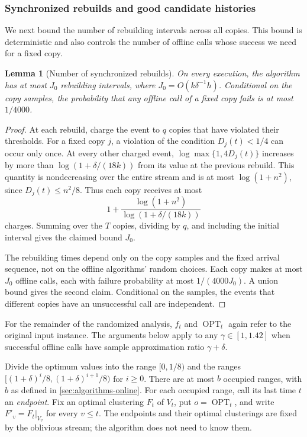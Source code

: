 \documentclass[11pt]{article}
\newtheorem{lemma}[theorem]{Lemma}
\newcommand{\OPT}{\operatorname{OPT}}
\begin{document}
\subsubsection{Synchronized rebuilds and good candidate histories}

We next bound the number of rebuilding intervals across all copies.
This bound is deterministic and also controls the number of offline
calls whose success we need for a fixed copy.

\begin{lemma}[Number of synchronized rebuilds]
\label{lem:online-rebuilds}
On every execution, the algorithm has at most $J_0$ rebuilding
intervals, where $J_0=O(k\delta^{-1}h)$.
Conditional on the copy samples, the probability that any offline
call of a fixed copy fails is at most $1/4000$.
\end{lemma}
\begin{proof}
At each rebuild, charge the event to $q$ copies that have violated
their thresholds. For a fixed copy $j$, a violation of the condition
$D_j(t)<1/4$ can occur only once. At every other charged event,
$\log\max\{1,4D_j(t)\}$ increases by more than
$\log(1+\delta/(18k))$ from its value at the previous rebuild.
This quantity is nondecreasing over the entire stream and is at most
$\log(1+n^2)$, since $D_j(t)\le n^2/8$. Thus each copy receives
at most
\[
 1+\frac{\log(1+n^2)}{\log(1+\delta/(18k))}
\]
charges. Summing over the $T$ copies, dividing by $q$, and including
the initial interval gives the claimed bound $J_0$.

The rebuilding times depend only on the copy samples and the fixed
arrival sequence, not on the offline algorithms' random choices.
Each copy makes at most $J_0$ offline calls, each with failure
probability at most $1/(4000J_0)$. A union bound gives the second
claim. Conditional on the samples, the events that different copies
have an unsuccessful call are independent.
\end{proof}

For the remainder of the randomized analysis, $f_t$ and $\OPT_t$
again refer to the original input instance. The arguments below apply
to any $\gamma\in[1,1.42]$ when successful offline calls have
sample approximation ratio $\gamma+\delta$.

Divide the optimum values into the range $[0,1/8)$
and the ranges $[(1+\delta)^i/8,(1+\delta)^{i+1}/8)$ for $i\ge0$.
There are at most $b$ occupied ranges, with $b$ as defined in
\cref{sec:algorithms-online}.
For each occupied range, call its last time $t$ an \emph{endpoint}.
Fix an optimal clustering $F_t$ of $V_t$, put $o=\OPT_t$, and
write $F'_v=F_t|_{V_v}$ for every $v\le t$. The endpoints and their optimal clusterings are fixed by the oblivious
stream; the algorithm does not need to know them.
\end{document}
